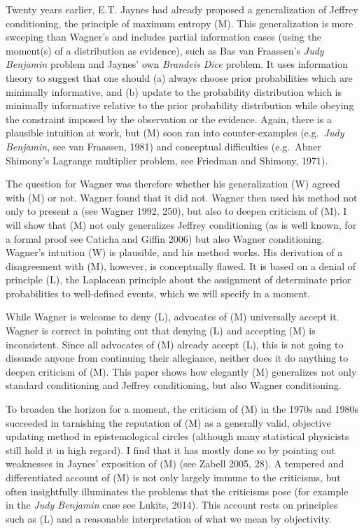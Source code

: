 \documentclass[12pt]{article}
\begin{document}
Twenty years earlier, E.T. Jaynes had already proposed a
generalization of Jeffrey conditioning, the principle of maximum
entropy (M). This generalization is more sweeping than Wagner's and
includes partial information cases (using the moment(s) of a
distribution as evidence), such as Bas van Fraassen's \emph{Judy
  Benjamin} problem and Jaynes' own \emph{Brandeis Dice} problem. It
uses information theory to suggest that one should (a) always choose
prior probabilities which are minimally informative, and (b) update to
the probability distribution which is minimally informative relative
to the prior probability distribution while obeying the constraint
imposed by the observation or the evidence. Again, there is a
plausible intuition at work, but (M) soon ran into counter-examples
(e.g.\ \emph{Judy Benjamin}, see van Fraassen, 1981) and conceptual
difficulties (e.g.\ Abner Shimony's Lagrange multiplier problem, see
Friedman and Shimony, 1971).

The question for Wagner was therefore whether his generalization (W)
agreed with (M) or not. Wagner found that it did not. Wagner then used
his method not only to present a  (see Wagner 1992, 250), but also to
deepen criticism of (M). I will show that (M) not only generalizes
Jeffrey conditioning (as is well known, for a formal proof see
Caticha and Giffin 2006) but also Wagner conditioning. Wagner's
intuition (W) is plausible, and his method works. His derivation of a
disagreement with (M), however, is conceptually flawed. It is based on
a denial of principle (L), the Laplacean principle about the
assignment of determinate prior probabilities to well-defined events,
which we will specify in a moment.

While Wagner is welcome to deny (L), advocates of (M) universally
accept it. Wagner is correct in pointing out that denying (L) and
accepting (M) is inconsistent. Since all advocates of (M) already
accept (L), this is not going to dissuade anyone from continuing their
allegiance, neither does it do anything to deepen criticism of (M).
This paper shows how elegantly (M) generalizes not only standard
conditioning and Jeffrey conditioning, but also Wagner conditioning.

To broaden the horizon for a moment, the criticism of (M) in the 1970s
and 1980s succeeded in tarnishing the reputation of (M) as a generally
valid, objective updating method in epistemological circles (although
many statistical physicists still hold it in high regard). I find that
it has mostly done so by pointing out weaknesses in Jaynes'
 exposition of (M) (see
Zabell 2005, 28). A tempered and differentiated account of (M)
is not only largely immune to the criticisms, but often insightfully
illuminates the problems that the criticisms pose (for example in the
\emph{Judy Benjamin} case see Lukits, 2014). This account
rests on principles such as (L) and a reasonable interpretation of
what we mean by objectivity.
\end{document}

